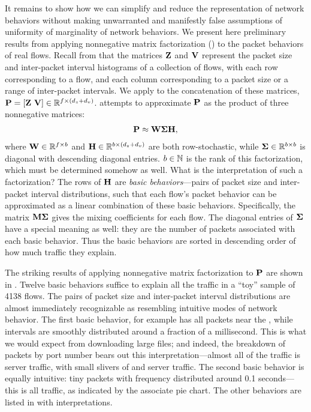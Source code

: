 \documentclass[twocolumn,final]{svjour3}
\begin{document}
It remains to show how we can simplify and reduce the representation of network behaviors without making unwarranted and manifestly false assumptions of uniformity of marginality of network behaviors. We present here preliminary results from applying nonnegative matrix factorization () to the packet behaviors of real flows. Recall from  that the matrices $\mathbf{Z}$ and $\mathbf{V}$ represent the packet size and inter-packet interval histograms of a collection of flows, with each row corresponding to a flow, and each column corresponding to a packet size or a range of inter-packet intervals. We apply  to the concatenation of these matrices, $\mathbf{P}=[\mathbf{Z}~\mathbf{V}] \in \mathbb{R}^{f \times (d_z+d_v)}$.  attempts to approximate $\mathbf{P}$ as the product of three nonnegative matrices:
\begin{align}
\mathbf{P} \approx \mathbf{W}\mathbf{\Sigma}\mathbf{H},
\end{align}
where $\mathbf{W} \in \mathbb{R}^{f \times b}$ and $\mathbf{H} \in \mathbb{R}^{b \times (d_z+d_v)}$ are both row-stochastic, while
$\mathbf{\Sigma} \in \mathbb{R}^{b \times b}$ is diagonal with descending diagonal entries.
$b\in\mathbb{N}$ is the rank of this factorization, which must be determined somehow as well.
What is the interpretation of such a factorization?
The rows of $\mathbf{H}$ are \emph{basic behaviors}---pairs of packet size and inter-packet interval distributions, such that each flow's packet behavior can be approximated as a linear combination of these basic behaviors.
Specifically, the matrix $\mathbf{M}\mathbf{\Sigma}$ gives the mixing coefficients for each flow.
The diagonal entries of $\mathbf{\Sigma}$ have a special meaning as well:
they are the number of packets associated with each basic behavior.
Thus the basic behaviors are sorted in descending order of how much traffic they explain.

The striking results of applying nonnegative matrix factorization to $\mathbf{P}$ are shown in . Twelve basic behaviors suffice to explain all the traffic in a ``toy''  sample of 4138 flows. The pairs of packet size and inter-packet interval distributions are almost immediately recognizable as resembling intuitive modes of network behavior. The first basic behavior, for example has all packets near the , while intervals are smoothly distributed around a fraction of a millisecond. This is what we would expect from downloading large files; and indeed, the breakdown of packets by port number bears out this interpretation---almost all of the traffic is  server traffic, with small slivers of  and  server traffic. The second basic behavior is equally intuitive: tiny packets with frequency distributed around 0.1 seconds---this is all  traffic, as indicated by the associate pie chart.
The other behaviors are listed in  with interpretations.
\end{document}
